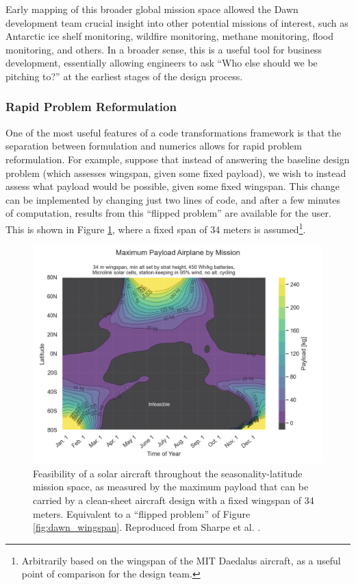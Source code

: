 Early mapping of this broader global mission space allowed the Dawn development team crucial insight into other potential missions of interest, such as Antarctic ice shelf monitoring, wildfire monitoring, methane monitoring, flood monitoring, and others. In a broader sense, this is a useful tool for business development, essentially allowing engineers to ask ``Who else should we be pitching to?'' at the earliest stages of the design process.

\subsubsection*{Rapid Problem Reformulation}

One of the most useful features of a code transformations framework is that the separation between formulation and numerics allows for rapid problem reformulation. For example, suppose that instead of answering the baseline design problem (which assesses wingspan, given some fixed payload), we wish to instead assess what payload would be possible, given some fixed wingspan. This change can be implemented by changing just two lines of code, and after a few minutes of computation, results from this ``flipped problem'' are available for the user. This is shown in Figure \ref{fig:dawn_payload}, where a fixed span of 34 meters is assumed\footnote{Arbitrarily based on the wingspan of the MIT Daedalus aircraft, as a useful point of comparison for the design team.}.

\begin{figure}[H]
    \centering
    \includegraphics[width=\textwidth]{../figures/dawnfigures/max_payload.png}
    \caption{Feasibility of a solar aircraft throughout the seasonality-latitude mission space, as measured by the maximum payload that can be carried by a clean-sheet aircraft design with a fixed wingspan of 34 meters. Equivalent to a ``flipped problem'' of Figure \ref{fig:dawn_wingspan}. Reproduced from Sharpe et al. \cite{sharpe_optimization_2021}.}
    \label{fig:dawn_payload}
\end{figure}


